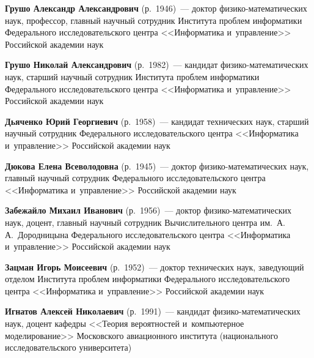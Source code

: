 \begin{multicols}{2}
\vspace*{2pt}

\noindent
\textbf{Грушо Александр Александрович} (р.\ 1946)~--- 
доктор фи\-зи\-ко-ма\-те\-ма\-ти\-че\-ских наук, профессор, главный научный со\-труд\-ник Института 
проб\-лем информатики Федерального исследовательского цент\-ра <<Информатика и~управ\-ле\-ние>>
 Российской академии наук
 

\columnbreak

\noindent
\textbf{Грушо Николай Александрович} (р.\ 1982)~--- кандидат 
фи\-зи\-ко-ма\-те\-ма\-ти\-че\-ских наук, старший научный со\-труд\-ник Института проб\-лем 
информатики Федерального исследовательского цент\-ра <<Информатика и~управ\-ле\-ние>> Российской академии наук

 \vspace*{2pt}
 
 \noindent
\textbf{Дьяченко Юрий Георгиевич} (р.\ 1958)~--- кандидат технических наук, 
старший научный сотрудник Федерального исследовательского цент\-ра <<Информатика и~управ\-ле\-ние>>
 Российской академии наук

\vspace*{2pt}

\noindent
\textbf{Дюкова Елена Всеволодовна} (р.\ 1945)~--- доктор фи\-зи\-ко-ма\-те\-ма\-ти\-че\-ских наук, 
главный научный сотрудник Федерального исследовательского цент\-ра <<Информатика и~управ\-ле\-ние>> 
Российской академии наук

\vspace*{2pt}

\noindent
\textbf{Забежайло Михаил Иванович} (р.\ 1956)~--- доктор фи\-зи\-ко-ма\-те\-ма\-ти\-че\-ских наук, 
доцент, главный научный со\-труд\-ник Вычислительного цент\-ра им.\ А.\,А.~Дородницына 
Федерального исследовательского цент\-ра <<Информатика и~управ\-ле\-ние>> Российской академии наук

\vspace*{2pt}

\noindent
\textbf{Зацман Игорь Моисеевич} (р.\ 1952)~--- доктор технических наук, 
за\-ве\-ду\-ющий отделом Института проб\-лем информатики Федерального исследовательского 
цент\-ра <<Информатика и~управ\-ле\-ние>> \mbox{Российской} академии наук



\vspace*{2pt}

\noindent
\textbf{Игнатов Алексей Николаевич} (р.\ 1991)~--- кандидат фи\-зи\-ко-ма\-те\-ма\-ти\-че\-ских наук, 
доцент кафедры <<Тео\-рия вероятностей и~компьютерное моделирование>>
 Московского авиационного института (национального исследовательского университета)
 

\end{multicols}
